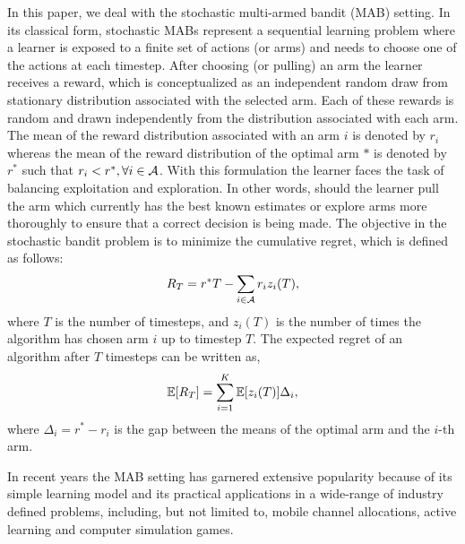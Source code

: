 In this paper, we deal with the stochastic multi-armed bandit (MAB) setting. In its classical form, stochastic MABs represent a sequential learning problem where a learner is exposed to a finite set of actions (or arms) and needs to choose one of the actions at each timestep. After choosing (or pulling) an arm the learner  receives a reward, which is conceptualized as an independent random draw from stationary distribution associated with the selected arm. Each of these rewards is random and drawn independently from the distribution associated with each arm. The mean of the reward distribution associated with an arm $i$ is denoted by $r_i$ whereas the mean of the reward distribution of the optimal arm $*$ is denoted by $r^*$ such that $r_i < r^*, \forall i\in \mathcal{A}$. With this formulation the learner faces the task of balancing exploitation and exploration. In other words, should the learner pull the arm which currently has the best known estimates or explore arms more thoroughly to ensure that a correct decision is being made. The objective in the stochastic bandit problem is to minimize the cumulative regret, which is defined as follows:
\begin{align*}
R_{T}=r^{*}T - \sum_{i\in \mathcal{A}} r_{i}z_{i}(T),
\end{align*}
where $T$ is the number of timesteps, and  $z_{i}(T)$ is the number of times the algorithm has chosen arm $i$ up to timestep $T$.
The expected regret of an algorithm after $T$ timesteps can be written as,
\begin{align*}
\mathbb{E}[R_{T}]= \sum_{i=1}^K \mathbb{E}[z_i (T)] \Delta_i,
\end{align*}
where $\Delta_{i}=r^{*}-r_{i}$ is the gap between the means of the optimal arm and the $i$-th arm.


	In recent years the MAB setting has garnered extensive popularity because of its simple learning  model and its practical applications in a wide-range of industry defined problems, including, but not limited to, mobile channel allocations, active learning and computer simulation games. 